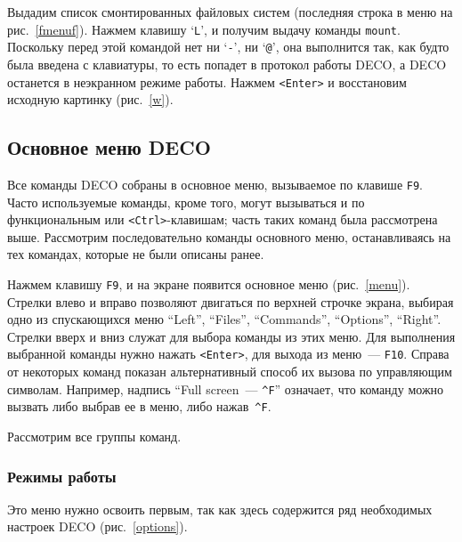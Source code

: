 
Выдадим список смонтированных файловых систем (последняя строка в меню
на рис.~\ref{fmenuf}). Нажмем клавишу `{\tt L}', и получим выдачу
команды {\tt mount}.
Поскольку перед этой командой нет ни `{\tt -}', ни `{\tt @}', она
выполнится так,
как будто была введена с клавиатуры, то есть попадет в протокол
работы DECO, а DECO останется в неэкранном режиме работы. Нажмем
{\tt <Enter>} и восстановим исходную картинку (рис.~\ref{w}).

\subsection{Основное меню DECO}

Все команды DECO собраны в основное меню, вызываемое по клавише {\tt F9}.
Часто используемые команды, кроме того, могут вызываться и по
функциональным или {\tt <Ctrl>}-клавишам; часть таких
команд была рассмотрена выше. Рассмотрим последовательно команды
основного меню, останавливаясь на тех командах, которые не были
описаны ранее.

Нажмем клавишу {\tt F9}, и на экране появится основное меню (рис.~\ref{menu}).
Стрелки влево и вправо позволяют двигаться по верхней строчке экрана,
выбирая одно из спускающихся
меню ``Left'', ``Files'', ``Commands'', ``Options'', ``Right''.
Стрелки вверх и вниз служат для выбора команды из этих меню. Для
выполнения выбранной команды нужно нажать {\tt <Enter>}, для выхода
из меню~--- {\tt F10}.
Справа от некоторых команд показан альтернативный способ их вызова по
управляющим символам. Например, надпись ``Full screen~--- {\tt \^{}F}''
означает, что команду можно вызвать либо выбрав ее в меню,
либо нажав~{\tt \^{}F}.

Рассмотрим все группы команд.

\subsubsection{Режимы работы}

Это меню нужно освоить первым, так как здесь содержится
ряд необходимых настроек DECO (рис.~\ref{options}).


